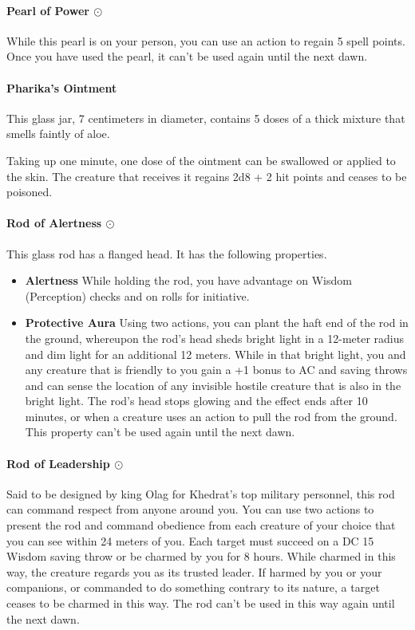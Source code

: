     \paragraph{Pearl of Power $\odot$}
        While this pearl is on your person, you can use an action to regain 5 spell points.
        Once you have used the pearl, it can't be used again until the next dawn.
    \paragraph{Pharika's Ointment}
        This glass jar, 7 centimeters in diameter, contains 5 doses of a thick mixture that smells faintly of aloe.

        Taking up one minute, one dose of the ointment can be swallowed or applied to the skin.
        The creature that receives it regains 2d8 + 2 hit points and ceases to be poisoned.
    \paragraph{Rod of Alertness $\odot$}
        This glass rod has a flanged head.
        It has the following properties.
        \begin{itemize}
            \item \textbf{Alertness}
            While holding the rod, you have advantage on Wisdom (Perception) checks and on rolls for initiative.
            \item \textbf{Protective Aura}
            Using two actions, you can plant the haft end of the rod in the ground, whereupon the rod's head sheds bright light in a 12-meter radius and dim light for an additional 12 meters.
            While in that bright light, you and any creature that is friendly to you gain a +1 bonus to AC and saving throws and can sense the location of any invisible hostile creature that is also in the bright light.
            The rod's head stops glowing and the effect ends after 10 minutes, or when a creature uses an action to pull the rod from the ground.
            This property can't be used again until the next dawn.
        \end{itemize}
    \paragraph{Rod of Leadership $\odot$}
        Said to be designed by king Olag for Khedrat's top military personnel, this rod can command respect from anyone around you.
        You can use two actions to present the rod and command obedience from each creature of your choice that you can see within 24 meters of you.
        Each target must succeed on a DC 15 Wisdom saving throw or be charmed by you for 8 hours.
        While charmed in this way, the creature regards you as its trusted leader.
        If harmed by you or your companions, or commanded to do something contrary to its nature, a target ceases to be charmed in this way.
        The rod can't be used in this way again until the next dawn.
